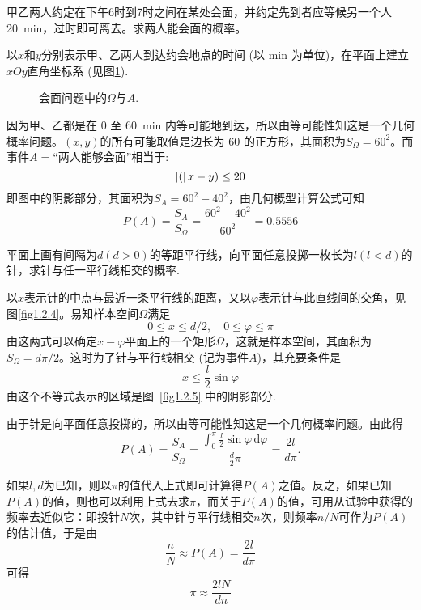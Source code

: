 \begin{example}[会商问题]
    甲乙两人约定在下午6时到7时之间在某处会面，并约定先到者应等候另一个人\SI{20}{\minute}，过时即可离去。求两人能会面的概率。
\end{example}
\begin{solution}
    以$x$和$y$分别表示甲、乙两人到达约会地点的时间 (以 \si{\minute} 为单位)，在平面上建立$xOy$直角坐标系 (见图\ref{fig:meeting_problem}).
    \begin{figure}[!ht]
        \centering
        \caption{会面问题中的$\Omega$与$A$.}
        \label{fig:meeting_problem}
    \end{figure}
    因为甲、乙都是在 0 至 \SI{60}{\minute} 内等可能地到达，所以由等可能性知这是一个几何概率问题。$(x, y)$的所有可能取值是边长为 60 的正方形，其面积为$S_\Omega = 60^2$。而事件$A =$“两人能够会面”相当于:
    \[ \left\lvert(\right\rvert x - y) \le 20 \]
    即图中的阴影部分，其面积为$S_A = 60^2 - 40^2$，由几何概型计算公式可知
    \[ P(A) = \frac{S_A}{S_\Omega} = \frac{60^2 - 40^2}{60^2} = 0.5556 \]
\end{solution}

\begin{example}[蒲丰投针问题]
    平面上画有间隔为$d (d > 0)$的等距平行线，向平面任意投掷一枚长为$l (l<d)$的针，求针与任一平行线相交的概率.
\end{example}
\begin{solution}
    以$x$表示针的中点与最近一条平行线的距离，又以$\varphi$表示针与此直线间的交角，见图\ref{fig1.2.4}。易知样本空间$\Omega$满足
    \[ 0 \le x \le d/2, \quad 0 \le \varphi \le \pi \]
    由这两式可以确定$x - \varphi$平面上的一个矩形$\Omega$，这就是样本空间，其面积为$S_\Omega = d\pi/2$。这时为了针与平行线相交 (记为事件$A$)，其充要条件是
    \[ x \le \frac{l}{2} \sin \varphi \]
    由这个不等式表示的区域是图~\ref{fig1.2.5} 中的阴影部分.

    由于针是向平面任意投掷的，所以由等可能性知这是一个几何概率问题。由此得
    \[
        P(A) = \frac{S_A}{S_\Omega}
        = \frac{\int_0^\pi \frac{l}{2} \sin \varphi \, \mathrm{d} \varphi}{\frac{d}{2} \pi}
        = \frac{2l}{d\pi}.
    \]

    如果$l,d$为已知，则以$\pi$的值代入上式即可计算得$P(A)$之值。反之，如果已知$P(A)$的值，则也可以利用上式去求$\pi$，而关于$P(A)$的值，可用从试验中获得的频率去近似它：即投针$N$次，其中针与平行线相交$n$次，则频率$n/N$可作为$P(A)$的估计值，于是由
    \[ \frac{n}{N} \approx P(A) = \frac{2l}{d\pi} \]
    可得
    \[ \pi \approx \frac{2lN}{dn} \]
\end{solution}

